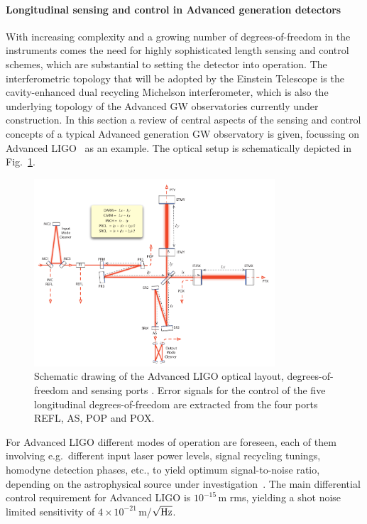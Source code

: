 \paragraph{Longitudinal sensing and control in Advanced generation detectors}%
With increasing complexity and a growing number of degrees-of-freedom in the instruments comes the need for highly sophisticated length sensing and control schemes, which  
are substantial to setting the detector into operation.
The interferometric topology that will be adopted by the Einstein Telescope is the cavity-enhanced dual recycling Michelson interferometer, 
which is also the underlying topology of the Advanced GW observatories currently under construction.
In this section a review of central aspects of the sensing and control concepts of a typical Advanced generation GW observatory is given, focussing on Advanced LIGO~\cite{AdvancedLIGO} as an example. 
The optical setup is schematically depicted in Fig.~\ref{Fig:Sec_Optics_AdvLIGO_IFO_Schematic}.

\begin{figure}[th]
\centering
\includegraphics[width=0.8\textwidth]{Sec_Optics/aLIGO_IFO_Schematic}
\caption[Schematic optical layout of Advanced LIGO]
{Schematic drawing of the Advanced LIGO optical layout, degrees-of-freedom and sensing ports \cite{aLIGO_lscfdd}. 
Error signals for the control of the five longitudinal degrees-of-freedom are extracted from the four ports REFL, AS, POP and POX.}
\label{Fig:Sec_Optics_AdvLIGO_IFO_Schematic}   
\end{figure}

For Advanced LIGO different modes of operation are foreseen, each of them involving e.g.\ different input laser power levels, signal
recycling tunings, homodyne detection phases, etc., to yield optimum signal-to-noise ratio, depending on the astrophysical source under investigation~\cite{aLIGO_lscfdd}. 
The main differential control requirement for Advanced LIGO is $10^{-15}$\,m rms, yielding a shot noise limited sensitivity of $4 \times 10^{-21}$\,m/$\sqrt{\textnormal{Hz}}$.

